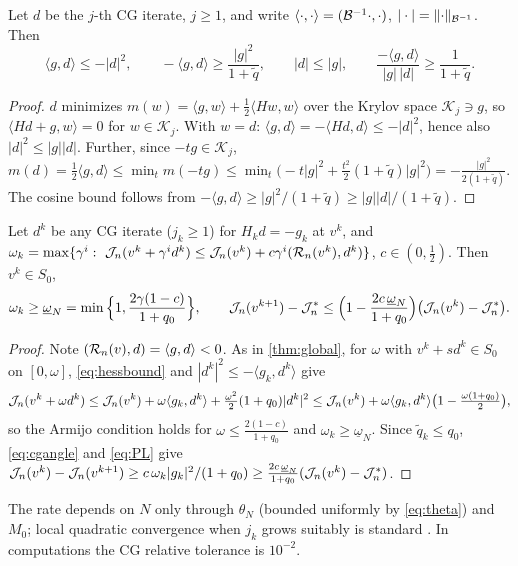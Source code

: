 \begin{lemma}\label{lem:cg}
Let $d$ be the $j$-th CG iterate, $j\ge1$, and write $\langle\cdot,\cdot\rangle=(\mathcal{B}^{-1}\cdot,\cdot)$, $|\cdot|=\lVert \cdot\rVert_{\mathcal{B}^{-1}}$. Then
\begin{equation}\label{eq:cgangle}
\langle g,d\rangle\le-|d|^2,\qquad -\langle g,d\rangle\ge\frac{|g|^2}{1+\tilde q},\qquad |d|\le|g|,\qquad \frac{-\langle g,d\rangle}{|g|\,|d|}\ge\frac1{1+\tilde q}.
\end{equation}
\end{lemma}

\begin{proof}
$d$ minimizes $m(w)=\langle g,w\rangle+\frac12\langle Hw,w\rangle$ over the Krylov space $\mathcal K_j\ni g$, so $\langle Hd+g,w\rangle=0$ for $w\in\mathcal K_j$. With $w=d$: $\langle g,d\rangle=-\langle Hd,d\rangle\le-|d|^2$, hence also $|d|^2\le|g||d|$. Further, since $-tg\in\mathcal K_j$, $m(d)=\frac12\langle g,d\rangle\le\min_tm(-tg)\le\min_t\big(-t|g|^2+\frac{t^2}2(1+\tilde q)|g|^2\big)=-\frac{|g|^2}{2(1+\tilde q)}$. The cosine bound follows from $-\langle g,d\rangle\ge|g|^2/(1+\tilde q)\ge|g||d|/(1+\tilde q)$.
\end{proof}

\begin{theorem}\label{thm:newton}
Let $d^k$ be any CG iterate ($j_k\ge1$) for $H_kd=-g_k$ at $v^k$, and $\omega_k=\max\{\gamma^i:\ \Jn(v^k+\gamma^id^k)\le\Jn(v^k)+c\gamma^i\ip{\Rn(v^k)}{d^k}\}$, $c\in(0,\frac12)$. Then $v^k\in S_0$,
\[
\omega_k\ge\underline\omega_N=\min\Big\{1,\frac{2\gamma(1-c)}{1+q_0}\Big\},\qquad \mathcal{J}_n(v^{k+1})-\mathcal{J}_n^*\le\Big(1-\frac{2c\,\underline\omega_N}{1+q_0}\Big)\big(\mathcal{J}_n(v^k)-\mathcal{J}_n^*\big).
\]
\end{theorem}

\begin{proof}
Note $(\mathcal{R}_n(v),d)=\langle g,d\rangle<0$. As in \cref{thm:global}, for $\omega$ with $v^k+sd^k\in S_0$ on $[0,\omega]$, \eqref{eq:hessbound} and $|d^k|^2\le-\langle g_k,d^k\rangle$ give
\[
\mathcal{J}_n(v^k+\omega d^k)\le\mathcal{J}_n(v^k)+\omega\langle g_k,d^k\rangle+\tfrac{\omega^2}2(1+q_0)|d^k|^2\le\mathcal{J}_n(v^k)+\omega\langle g_k,d^k\rangle\big(1-\tfrac{\omega(1+q_0)}2\big),
\]
so the Armijo condition holds for $\omega\le\frac{2(1-c)}{1+q_0}$ and $\omega_k\ge\underline\omega_N$. Since $\tilde q_k\le q_0$, \eqref{eq:cgangle} and \eqref{eq:PL} give $\mathcal{J}_n(v^k)-\mathcal{J}_n(v^{k+1})\ge c\,\omega_k|g_k|^2/(1+q_0)\ge\frac{2c\,\underline\omega_N}{1+q_0}(\mathcal{J}_n(v^k)-\mathcal{J}_n^*)$.
\end{proof}
The rate depends on $N$ only through $\theta_N$ (bounded uniformly by \eqref{eq:theta}) and $M_0$; local quadratic convergence when $j_k$ grows suitably is standard \cite{NocedalWright2006}. In computations the CG relative tolerance is $10^{-2}$.

